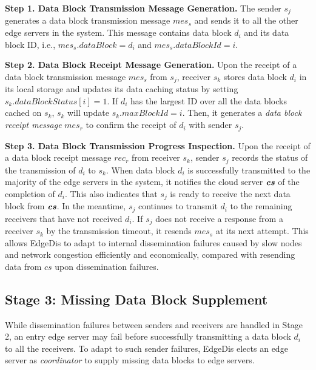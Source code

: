 \documentclass[10pt,journal,compsoc]{IEEEtran}
\def\mathbi#1{\textbf{\em #1}}
\begin{document}
\smallskip
\textbf{Step 1. Data Block Transmission Message Generation.} The sender $s_j$ generates a data block transmission message $mes_s$ and sends it to all the other edge servers in the system. This message contains data block $d_i$ and its data block ID, i.e., $mes_s.dataBlock = d_i$ and $mes_s.dataBlockId = i$. 

\smallskip
\textbf{Step 2. Data Block Receipt Message Generation.} Upon the receipt of a data block transmission message $mes_s$ from $s_j$, receiver $s_k$ stores data block $d_i$ in its local storage and updates its data caching status by setting $s_k.dataBlockStatus[i]=1$. If $d_i$ has the largest ID over all the data blocks cached on $s_k$, $s_k$ will update $s_k.maxBlockId=i$. Then, it generates a \textit{data block receipt message} $mes_r$ to confirm the receipt of $d_i$ with sender $s_j$.

\smallskip
\textbf{Step 3. Data Block Transmission Progress Inspection.} Upon the receipt of a data block receipt message $rec_r$ from receiver $s_k$, sender $s_j$ records the status of the transmission of $d_i$ to $s_k$. When data block $d_i$ is successfully transmitted to the majority of the edge servers in the system, it notifies the cloud server $\mathbi{cs}$ of the completion of $d_i$. This also indicates that $s_j$ is ready to receive the next data block from $\mathbi{cs}$. In the meantime, $s_j$ continues to transmit $d_i$ to the remaining receivers that have not received $d_i$. If $s_j$ does not receive a response from a receiver $s_k$ by the transmission timeout, it resends $mes_s$ at its next attempt. This allows EdgeDis to adapt to internal dissemination failures caused by slow nodes and network congestion efficiently and economically, compared with resending data from $cs$ upon dissemination failures.

%
\subsection{Stage 3: Missing Data Block Supplement}
\label{subSec:MissingDataRecovery}

While dissemination failures between senders and receivers are handled in Stage 2, an entry edge server may fail before successfully transmitting a data block $d_i$ to all the receivers. To adapt to such sender failures, EdgeDis elects an edge server as \textit{coordinator} to supply missing data blocks to edge servers.
\end{document}

